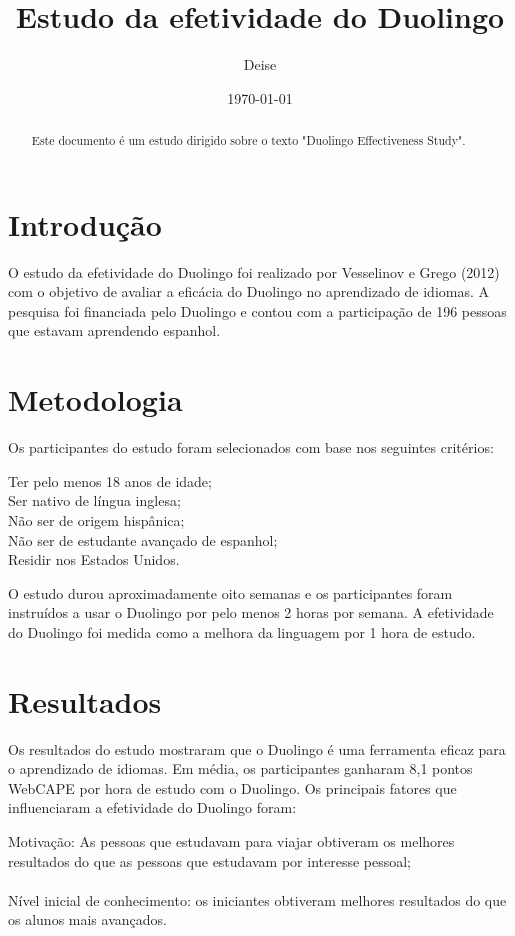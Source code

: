 \documentclass[a4paper, 12pt]{article}
\title{Estudo da efetividade do Duolingo}
\author{Deise}
\date{\today}
\begin{document}
\maketitle
\begin{abstract}
    Este documento é um estudo dirigido sobre o texto "Duolingo Effectiveness Study".
\end{abstract}
\section{Introdução}
O estudo da efetividade do Duolingo foi realizado por Vesselinov e Grego (2012) com o objetivo de avaliar a eficácia do Duolingo no aprendizado de idiomas. A pesquisa foi financiada pelo Duolingo e contou com a participação de 196 pessoas que estavam aprendendo espanhol.
\section{Metodologia}
Os participantes do estudo foram selecionados com base nos seguintes critérios: 
\begin{itemize}

     Ter pelo menos 18 anos de idade; \\
     Ser nativo de língua inglesa; \\
     Não ser de origem hispânica; \\
     Não ser de estudante avançado de espanhol; \\
     Residir nos Estados Unidos. 
    
\end{itemize}
O estudo durou aproximadamente oito semanas e os participantes foram instruídos a usar o Duolingo por pelo menos 2 horas por semana.
A efetividade do Duolingo foi medida como a melhora da linguagem por 1 hora de estudo.
\section{Resultados}
Os resultados do estudo mostraram que o Duolingo é uma ferramenta eficaz para o aprendizado de idiomas. Em média, os participantes ganharam 8,1 pontos WebCAPE por hora de estudo com o Duolingo. Os principais fatores que influenciaram a efetividade do Duolingo foram: \\

\begin{itemize}
     Motivação: As pessoas que estudavam para viajar obtiveram os melhores resultados do que as pessoas que estudavam por interesse pessoal; \\
    \\
     Nível inicial de conhecimento: os iniciantes obtiveram melhores resultados do que os alunos mais avançados. 
\end{itemize}
\end{document}
